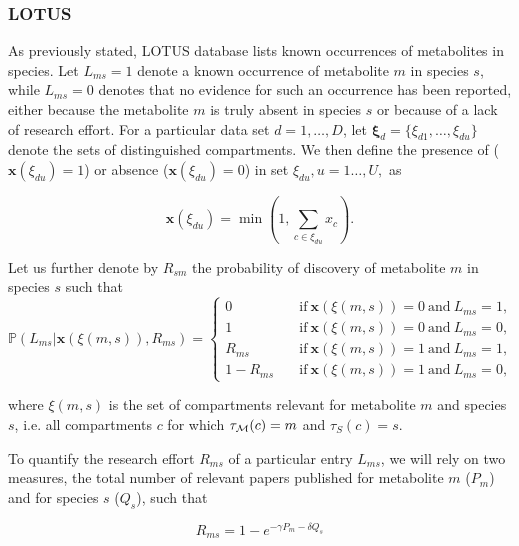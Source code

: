 \documentclass[
11pt, %
oneside, %
english, %
singlespacing, %
headsepline, %
chapterinoneline, %
]{MastersDoctoralThesis} %
\def\P{\mathbb{P}}
\def\x{\boldsymbol{x}}
\def\bxi{\boldsymbol{\xi}}
\def\M{{\cal M}}
\begin{document}
	\subsubsection{LOTUS}
	
	As previously stated, LOTUS database \cite{rutzLOTUSInitiativeOpen2022} lists known occurrences of metabolites in species. Let $L_{ms} = 1$ denote a known occurrence of metabolite $m$ in species $s$, while $L_{ms}=0$ denotes that no evidence for such an occurrence has been reported, either because the metabolite $m$ is truly absent in species $s$ or because of a lack of research effort. For a particular data set $d=1, \ldots, D$, let $\bxi_d=\{\xi_{d1}, \ldots, \xi_{du}\}$ denote the sets of distinguished compartments. We then define the presence of ($\x(\xi_{du})=1$) or absence ($\x(\xi_{du})=0$) in set $\xi_{du}, u=1\ldots,U,$ as
	
	\begin{equation}\label{eq:dimension reduction}
		\x(\xi_{du}) = \min \left(1, \sum_{c \in \xi_{du}} x_c \right).
	\end{equation}
	
	Let us further denote by $R_{sm}$ the probability of discovery of metabolite $m$ in species $s$ such that
	\begin{equation}\label{eq:prob lotus given x and Rsm}
		\P(L_{ms}|\x(\xi(m,s)), R_{ms}) = 
		\begin{cases}
			0 \quad &\mathrm{if\ } \x(\xi(m,s))=0 \mathrm{\ and\ } L_{ms} = 1,\\
			1 \quad &\mathrm{if\ } \x(\xi(m,s))=0 \mathrm{\ and\ } L_{ms} = 0,\\
			R_{ms} \quad &\mathrm{if\ } \x(\xi(m,s))=1 \mathrm{\ and\ } L_{ms} = 1,\\
			1- R_{ms} \quad &\mathrm{if\ } \x(\xi(m,s))=1 \mathrm{\ and\ } L_{ms} = 0,
		\end{cases}
	\end{equation}
	
	where $\xi(m,s)$ is the set of compartments relevant for metabolite $m$ and species $s$, i.e. all compartments $c$ for which $\tau_\M(c)=m$ and $\tau_S(c)=s$.
	
	To quantify the research effort $R_{ms}$ of a particular entry $L_{ms}$, we will rely on two measures, the total number of relevant papers published for metabolite $m$ ($P_m$) and for species $s$ ($Q_s$), such that
	
	\begin{equation}\label{eq:research effort}
		R_{ms} = 1 - e^{-\gamma P_m - \delta Q_s}
	\end{equation}
	
\end{document}
